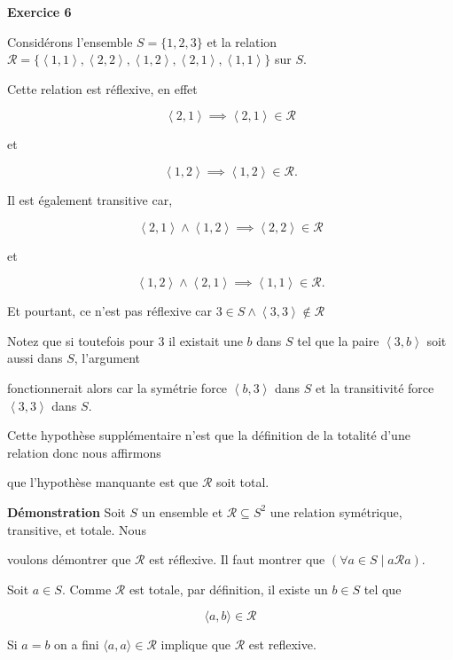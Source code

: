 \documentclass{article}
\newcommand{\tuple}[1]{\ensuremath{\left\langle #1 \right\rangle}}
\begin{document}
\textbf{Exercice 6}

\vspace{0.5cm}

Considérons l'ensemble $S = \{ 1, 2, 3 \}$ et la relation $\mathcal{R}=\{ \tuple{1,1}, \tuple{2,2},\tuple{1,2},\tuple{2,1},\tuple{1,1} \}$ sur $S$. 

Cette relation est réflexive, en effet

$$\tuple{2,1} \implies \tuple{2,1} \in \mathcal{R}$$

et

$$\tuple{1,2} \implies \tuple{1,2} \in \mathcal{R}.$$

Il est également transitive car,

$$\tuple{2,1} \land \tuple{1,2} \implies \tuple{2,2} \in \mathcal{R}$$

et

$$\tuple{1,2} \land \tuple{2,1}\implies \tuple{1,1} \in \mathcal{R}.$$

Et pourtant, ce n'est pas réflexive car $ 3 \in S \land \tuple{3,3} \notin \mathcal{R} $ 

\vspace{0.5cm}

Notez que si toutefois pour $3$ il existait une $b$ dans $S$ tel que la paire $\tuple{3,b}$ soit aussi dans $S$, l’argument 

fonctionnerait alors car la symétrie force $\tuple{b,3}$ dans $S$ et la transitivité force $\tuple{3,3}$ dans $S$.

Cette hypothèse supplémentaire n'est que la définition de la totalité d'une relation donc nous affirmons 

que l'hypothèse manquante est que $\mathcal{R}$ soit total.

\vspace{0.5cm}

\textbf{Démonstration} Soit \(S\) un ensemble et \(\mathcal{R} \subseteq S^2\) une relation symétrique, transitive, et totale. Nous 

voulons démontrer que \( \mathcal{R} \) est réflexive. Il faut montrer que $ ( \forall a \in S \mid a \mathcal{R} a)$.

Soit \(a \in S\). Comme \( \mathcal{R} \) est totale, par définition, il existe un \(b \in S\) tel que 

$$ \langle a, b \rangle \in \mathcal{R} $$

Si $a = b$ on a fini $ \langle a,a \rangle \in \mathcal{R}$ implique que $ \mathcal{R}$ est reflexive.
\end{document}
